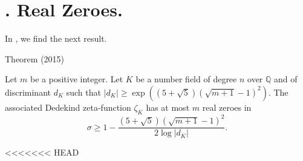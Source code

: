 \section{. Real Zeroes.}


In
\cite{Louboutin*15b},
we find the next result.

\par 
\begin{thm}{Theorem (2015)}

Let $m$ be a positive integer.
  Let $K$ be a number field of degree $n$ over $\mathbb{Q}$ and of
discriminant $d_K$ such that $|d_K|\ge
\exp((5+\sqrt{5})(\sqrt{m+1}-1)^2)$.
The associated Dedekind
zeta-function $\zeta_K$ has at most $m$ real zeroes in
$$
\sigma\ge 1-\frac{(5+\sqrt{5})(\sqrt{m+1}-1)^2}{2\log|d_K|}.
$$
\end{thm}



  
<<<<<<< HEAD














